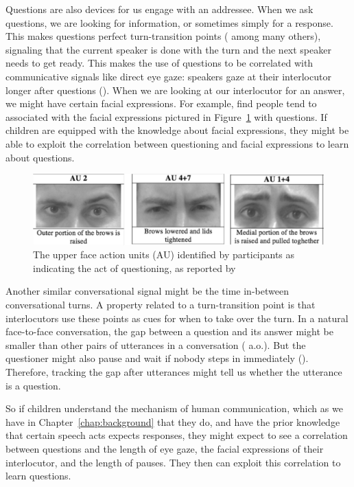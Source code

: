 Questions are also devices for us engage with an addressee. When we ask questions, we are looking for information, or sometimes simply for a response. This makes questions perfect turn-transition points (\cite{duncan1972turn} among many others), signaling that the current speaker is done with the turn and the next speaker needs to get ready. This makes the use of questions to be correlated with  communicative signals like direct eye gaze: speakers gaze at their interlocutor longer after questions (\cite{argyle1972gaze}). When we are looking at our interlocutor for an answer, we might have certain facial expressions. For example, \textcite{domaneschi2017facial} find people tend to associated with the facial expressions pictured in Figure~\ref{fig:engsp:au} with questions. If children are equipped with the knowledge about facial expressions, they might be able to exploit the correlation between questioning and facial expressions to learn about questions. 
\begin{figure}[H]
    \centering
    \includegraphics[width=1\textwidth]{figures/q-aus.jpg}     
    \caption{The upper face action units (AU) identified by participants as indicating the act of questioning, as reported by \cite{domaneschi2017facial}}
    \label{fig:engsp:au}
\end{figure}

Another similar conversational signal might be the time in-between conversational turns. A property related to a turn-transition point is that interlocutors use these points as cues for when to take over the turn. In a natural face-to-face conversation, the gap between a question and its answer might be smaller than other pairs of utterances in a conversation (\citealt{tice2011turn} a.o.). But the questioner might also pause and wait if nobody steps in immediately (\cite{sacks1978pause}). Therefore, tracking the gap after utterances might tell us whether the utterance is a question.


So if children understand the mechanism of human communication, which as we have in Chapter~\ref{chap:background} that they do, and have the prior knowledge that certain speech acts expects responses, they might expect to see a correlation between questions and the length of eye gaze, the facial expressions of their interlocutor, and the length of pauses. They then can exploit this correlation to learn questions.

